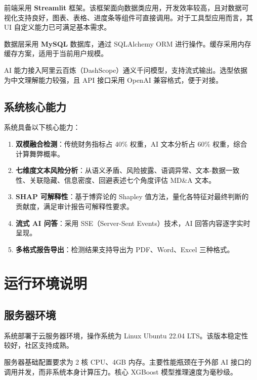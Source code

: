 \documentclass[12pt,a4paper]{ctexart}
\begin{document}
前端采用 \textbf{Streamlit} 框架。该框架面向数据类应用，开发效率较高，且对数据可视化支持良好，图表、表格、进度条等组件可直接调用。对于工具型应用而言，其 UI 自定义能力已可满足基本需求。

数据层采用 \textbf{MySQL} 数据库，通过 SQLAlchemy ORM 进行操作。缓存采用内存缓存方案，适用于当前用户规模。

AI 能力接入阿里云百炼（DashScope）通义千问模型，支持流式输出。选型依据为中文理解能力较强，且 API 接口采用 OpenAI 兼容格式，便于对接。

\subsection{系统核心能力}

系统具备以下核心能力：

\begin{enumerate}
    \item \textbf{双模融合检测}：传统财务指标占 40\% 权重，AI 文本分析占 60\% 权重，综合计算舞弊概率。
    \item \textbf{七维度文本风险分析}：从语义矛盾、风险披露、语调异常、文本-数据一致性、关联隐藏、信息密度、回避表述七个角度评估 MD\&A 文本。
    \item \textbf{SHAP 可解释性}：基于博弈论的 Shapley 值方法，量化各特征对最终判断的贡献度，满足审计报告可解释性要求。
    \item \textbf{流式 AI 问答}：采用 SSE（Server-Sent Events）技术，AI 回答内容逐字实时呈现。
    \item \textbf{多格式报告导出}：检测结果支持导出为 PDF、Word、Excel 三种格式。
\end{enumerate}

\newpage

\section{运行环境说明}

\subsection{服务器环境}

系统部署于云服务器环境，操作系统为 Linux Ubuntu 22.04 LTS。该版本稳定性较好，社区支持成熟。

服务器基础配置要求为 2 核 CPU、4GB 内存。主要性能瓶颈在于外部 AI 接口的调用并发，而非系统本身计算压力。核心 XGBoost 模型推理速度为毫秒级。
\end{document}
